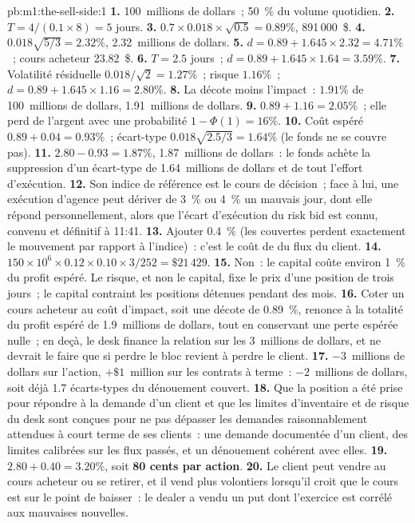 \begin{solution}{pb:m1:the-sell-side:1}
\textbf{1.} 100~millions de dollars~; 50~\% du volume quotidien.
\textbf{2.} $T = 4/(0.1\times 8) = 5$ jours.
\textbf{3.} $0.7\times 0.018\times\sqrt{0.5} = 0.89\%$, 891\,000~\$.
\textbf{4.} $0.018\sqrt{5/3} = 2.32\%$, 2.32~millions de dollars.
\textbf{5.} $d = 0.89 + 1.645\times 2.32 = 4.71\%$~; cours acheteur 23.82~\$.
\textbf{6.} $T = 2.5$ jours~; $d = 0.89 + 1.645 \times 1.64 = 3.59\%$.
\textbf{7.} Volatilité résiduelle $0.018/\sqrt2 = 1.27\%$~; risque $1.16\%$~;
$d = 0.89 + 1.645\times 1.16 = 2.80\%$.
\textbf{8.} La décote moins l'impact~: $1.91\%$ de 100~millions de dollars,
1.91~millions de dollars.
\textbf{9.} $0.89 + 1.16 = 2.05\%$~; elle perd de l'argent avec une probabilité
$1-\Phi(1) = 16\%$.
\textbf{10.} Coût espéré $0.89 + 0.04 = 0.93\%$~; écart-type
$0.018\sqrt{2.5/3} = 1.64\%$ (le fonds ne se couvre pas).
\textbf{11.} $2.80 - 0.93 = 1.87\%$, 1.87~millions de dollars~: le fonds achète la
suppression d'un écart-type de 1.64~millions de dollars et de tout l'effort d'exécution.
\textbf{12.} Son indice de référence est le cours de décision~; face à lui, une exécution
d'agence peut dériver de 3~\% ou 4~\% un mauvais jour, dont elle répond
personnellement, alors que l'écart d'exécution du risk bid est connu, convenu et définitif à
11:41.
\textbf{13.} Ajouter 0.4~\% (les  couvertes perdent exactement le mouvement par rapport à
l'indice)~: c'est le coût de  du flux du client.
\textbf{14.} $150\times10^6 \times 0.12 \times 0.10 \times 3/252 = \$21\,429$.
\textbf{15.} Non~: le capital coûte environ 1~\% du profit espéré. Le risque, et non le
capital, fixe le prix d'une position de trois jours~; le capital contraint les positions détenues pendant
des mois.
\textbf{16.} Coter un cours acheteur au coût d'impact, soit une décote de 0.89~\%, renonce à la
totalité du profit espéré de 1.9~millions de dollars, tout en conservant une perte espérée nulle~;
en deçà, le desk finance la relation sur les 3~millions de dollars, et
ne devrait le faire que si perdre le bloc revient à perdre le client.
\textbf{17.} $-3$~millions de dollars sur l'action, $+\$1$~million sur les contrats à terme~:
$-2$~millions de dollars, soit déjà 1.7 écarts-types du dénouement couvert.
\textbf{18.} Que la position a été prise pour répondre à la demande d'un client et que
les limites d'inventaire et de risque du desk sont conçues pour ne pas dépasser les
demandes raisonnablement attendues à court terme de ses clients~: une demande documentée
d'un client, des limites calibrées sur les flux passés, et un dénouement cohérent avec elles.
\textbf{19.} $2.80 + 0.40 = 3.20\%$, soit \textbf{80 cents par action}.
\textbf{20.} Le client peut vendre au cours acheteur ou se retirer, et il vend plus
volontiers lorsqu'il croit que le cours est sur le point de baisser~: le dealer a vendu
un put dont l'exercice est corrélé aux mauvaises nouvelles.
\end{solution}

